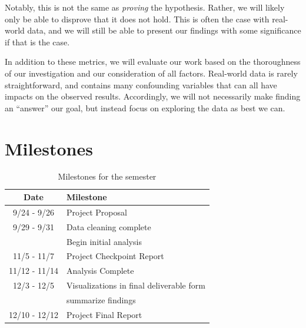 \documentclass[sigconf, hyperref={colorlinks=true,linkcolor=blue,urlcolor=blue}]{acmart}
\begin{document}
Notably, this is not the same as \textit{proving} the hypothesis. Rather, we will likely
only be able to disprove that it does not hold. This is often the case with real-world data,
and we will still be able to present our findings with some significance if that is the case.

In addition to these metrics, we will evaluate our work based on the thoroughness of our
investigation and our consideration of all factors. Real-world data is rarely straightforward,
and contains many confounding variables that can all have impacts on the observed results.
Accordingly, we will not necessarily make finding an “answer” our goal, but instead focus on
exploring the data as best we can.

\section{Milestones}
\begin{table}[H]
  \caption{Milestones for the semester}
  \label{tab:freq}
  \begin{tabular}{c|l}
    \toprule
    Date & Milestone \\
    \midrule
     9/24 - 9/26 & Project Proposal \\
     9/29 - 9/31 & Data cleaning complete \\
                 & Begin initial analysis \\
     11/5 - 11/7 & Project Checkpoint Report \\
   11/12 - 11/14 & Analysis Complete \\
     12/3 - 12/5 & Visualizations in final deliverable form \\
                 & summarize findings \\
   12/10 - 12/12 & Project Final Report \\
  \bottomrule
\end{tabular}
\end{table}
\end{document}
